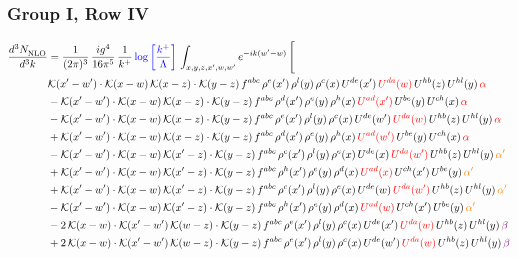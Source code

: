 \documentclass[9pt]{article}
\numberwithin{equation}{section}
\begin{document}
\subsubsection{Group I, Row IV}
\begin{align}
    \frac{d^{3}N_{\rm NLO}^{\rm}}{d^{3}k}  & = \frac{1}{(2\pi)^{3}}\, \frac{ig^{4}}{16\pi^{5}}\, \frac{1}{k^{+}}\, {\color{blue}\log{\left[\frac{k^{+}}{\Lambda}\right]}}\, \int_{x,y,z,x^{\prime},w,w^{\prime}}e^{-ik(w^{\prime}-w)}\, \Bigg[\notag \\ & \mathcal{K}(x'-w')\cdot \mathcal{K}(x-w)\,\mathcal{K}(x-z)\cdot \mathcal{K}(y-z)\,f^{abc}\, \rho^{e}(x')\, \rho^{l}(y)\,\rho^{c}(x)\, U^{de}(x')\,{\color{red}U^{da}(w)}\,U^{hb}(z)\,U^{hl}(y)\, {\color{red}\alpha}\notag \\ & -\mathcal{K}(x'-w')\cdot \mathcal{K}(x-w)\,\mathcal{K}(x-z)\cdot \mathcal{K}(y-z)\,f^{abc}\, \rho^{d}(x')\, \rho^{e}(y)\,\rho^{h}(x)\, {\color{red}U^{ad}(x')}\,U^{be}(y)\,U^{ch}(x)\,{\color{red} \alpha}\notag \\ & -\mathcal{K}(x'-w')\cdot \mathcal{K}(x-w)\,\mathcal{K}(x-z)\cdot \mathcal{K}(y-z)\,f^{abc}\, \rho^{e}(x')\, \rho^{l}(y)\,\rho^{c}(x)\, U^{de}(w')\,{\color{red}U^{da}(w)}\,U^{hb}(z)\,U^{hl}(y)\,{\color{red} \alpha}\notag\\ & +\mathcal{K}(x'-w')\cdot \mathcal{K}(x-w)\,\mathcal{K}(x-z)\cdot \mathcal{K}(y-z)\,f^{abc}\, \rho^{d}(x')\, \rho^{e}(y)\,\rho^{h}(x)\, {\color{red}U^{ad}(w')}\,U^{be}(y)\,U^{ch}(x)\,{\color{red} \alpha}\notag\\ &-\mathcal{K}(x'-w')\cdot\mathcal{K}(x-w)\,\mathcal{K}(x'-z)\cdot\mathcal{K}(y-z)\, f^{abc}\,\rho^{c}(x')\,\rho^{l}(y)\,\rho^{e}(x)\,U^{de}(x)\,{\color{red}U^{da}(w')}\,U^{hb}(z)\,U^{hl}(y)\,{\color{orange} \alpha'}\notag\\ & +\mathcal{K}(x'-w')\cdot\mathcal{K}(x-w)\,\mathcal{K}(x'-z)\cdot\mathcal{K}(y-z)\, f^{abc}\,\rho^{h}(x')\,\rho^{e}(y)\,\rho^{d}(x)\,{\color{red}U^{ad}(x)}\,U^{ch}(x')\,U^{be}(y)\,{\color{orange} \alpha'}\notag\\
&+\mathcal{K}(x'-w')\cdot\mathcal{K}(x-w)\,\mathcal{K}(x'-z)\cdot\mathcal{K}(y-z)\, f^{abc}\,\rho^{c}(x')\,\rho^{l}(y)\,\rho^{e}(x)\,U^{de}(w)\,{\color{red}U^{da}(w')}\,U^{hb}(z)\,U^{hl}(y)\,{\color{orange} \alpha'}\notag \\ &-\mathcal{K}(x'-w')\cdot\mathcal{K}(x-w)\,\mathcal{K}(x'-z)\cdot\mathcal{K}(y-z)\, f^{abc}\,\rho^{h}(x')\,\rho^{e}(y)\,\rho^{d}(x)\,{\color{red}U^{ad}(w)}\,U^{ch}(x')\,U^{be}(y)\,{\color{orange} \alpha'}\notag \\ &  -2\,\mathcal{K}(x-w)\cdot \mathcal{K}(x'-w')\, \mathcal{K}(w-z)\cdot \mathcal{K}(y-z)\, f^{abc}\,\rho^{e}(x')\,\rho^{l}(y)\,\rho^{c}(x)\, U^{de}(x')\,{\color{red}U^{da}(w)}\,U^{hb}(z)\,U^{hl}(y)\,{\color{violet} \beta}\notag\\ & +2\,\mathcal{K}(x-w)\cdot \mathcal{K}(x'-w')\, \mathcal{K}(w-z)\cdot \mathcal{K}(y-z)\, f^{abc}\,\rho^{e}(x')\,\rho^{l}(y)\,\rho^{c}(x)\, U^{de}(w')\,{\color{red}U^{da}(w)}\,U^{hb}(z)\,U^{hl}(y)\,{\color{violet} \beta}\notag\\

\end{align}
\end{document}
